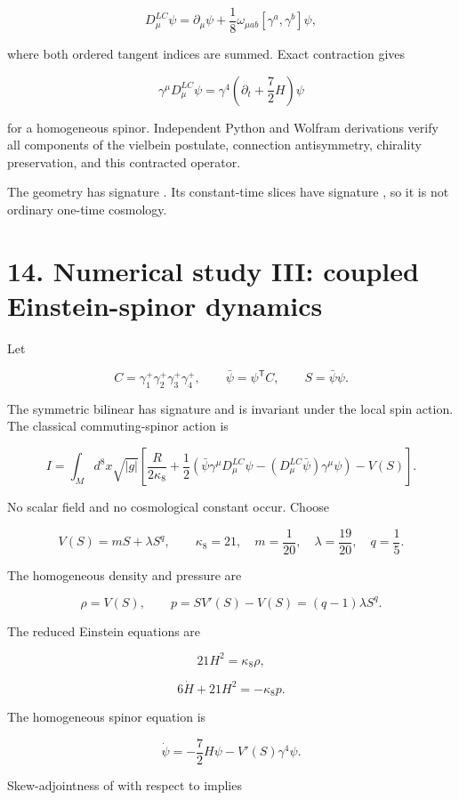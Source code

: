 \documentclass[11pt]{article}
\begin{document}
\[
D^{LC}_\mu\psi
=\partial_\mu\psi
+\frac18\omega_{\mu ab}[\gamma^a,\gamma^b]\psi,
\]

where both ordered tangent indices are summed. Exact contraction gives

\[
\gamma^\mu D^{LC}_\mu\psi
=\gamma^4\left(\partial_t+\frac72H\right)\psi
\]

for a homogeneous spinor. Independent Python and Wolfram derivations verify all components of the vielbein postulate, connection antisymmetry, chirality preservation, and this contracted operator.

The geometry has signature \texttt{}. Its constant-time slices have signature \texttt{}, so it is not ordinary one-time cosmology.

\section{14. Numerical study III: coupled Einstein-spinor dynamics}

Let

\[
C=\gamma_1^+\gamma_2^+\gamma_3^+\gamma_4^+,
\qquad
\bar\psi=\psi^{\mathsf T}C,
\qquad
S=\bar\psi\psi.
\]

The symmetric bilinear \texttt{} has signature \texttt{} and is invariant under the local spin action. The classical commuting-spinor action is

\[
I=\int_Md^8x\sqrt{|g|}\left[
\frac{R}{2\kappa_8}
+\frac12\left(
\bar\psi\gamma^\mu D^{LC}_\mu\psi
-(D^{LC}_\mu\bar\psi)\gamma^\mu\psi
\right)-V(S)\right].
\]

No scalar field and no cosmological constant occur. Choose

\[
V(S)=mS+\lambda S^q,
\qquad
\kappa_8=21,
\quad m=\frac1{20},
\quad \lambda=\frac{19}{20},
\quad q=\frac15.
\]

The homogeneous density and pressure are

\[
\rho=V(S),
\qquad
p=SV'(S)-V(S)=(q-1)\lambda S^q.
\]

The reduced Einstein equations are

\[
21H^2=\kappa_8\rho,
\]

\[
6\dot H+21H^2=-\kappa_8p.
\]

The homogeneous spinor equation is

\[
\dot\psi=-\frac72H\psi-V'(S)\gamma^4\psi.
\]

Skew-adjointness of \texttt{} with respect to \texttt{} implies
\end{document}
